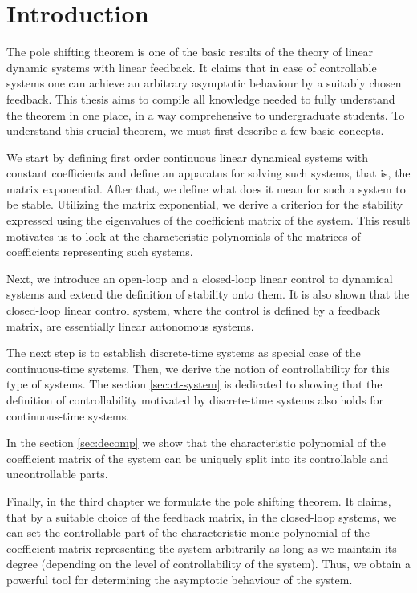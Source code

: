 \chapter*{Introduction}

The pole shifting theorem is one of the basic results of the theory of linear dynamic systems with linear feedback. It claims that in case of controllable systems one can achieve an arbitrary asymptotic behaviour by a suitably chosen feedback. This thesis aims to compile all knowledge needed to fully understand the theorem in one place, in a way comprehensive to undergraduate students. To understand this crucial theorem, we must first describe a few basic concepts. 

We start by defining first order continuous linear dynamical systems with constant coefficients and define an apparatus for solving such systems, that is, the matrix exponential. After that, we define what does it mean for such a system to be stable. Utilizing the matrix exponential, we derive a criterion for the stability expressed using the eigenvalues of the coefficient matrix of the system. This result motivates us to look at the characteristic polynomials of the matrices of coefficients representing such systems. 

Next, we introduce an open-loop and a closed-loop linear control to dynamical systems and extend the definition of stability onto them. It is also shown that the closed-loop linear control system, where the control is defined by a feedback matrix, are essentially linear autonomous systems. 

The next step is to establish discrete-time systems as special case of the continuous-time systems. Then, we derive the notion of controllability for this type of systems. The section \ref{sec:ct-system} is dedicated to showing that the definition of controllability motivated by discrete-time systems also holds for continuous-time systems.

In the section \ref{sec:decomp} we show that the characteristic polynomial of the coefficient matrix of the system can be uniquely split into its controllable and uncontrollable parts. 

Finally, in the third chapter we formulate the pole shifting theorem. It claims, that by a suitable choice of the feedback matrix, in the closed-loop systems, we can set the controllable part of the characteristic monic polynomial of the coefficient matrix representing the system arbitrarily as long as we maintain its degree (depending on the level of controllability of the system). Thus, we obtain a powerful tool for determining the asymptotic behaviour of the system.